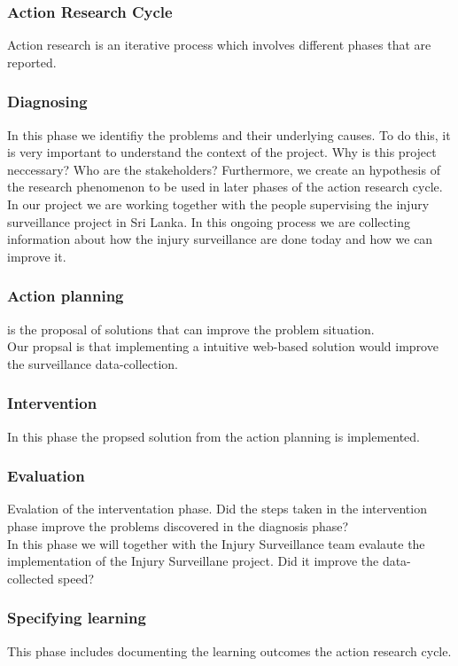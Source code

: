 \documentclass[UKenglish, 12pt]{article}
\begin{document}
\subsubsection*{Action Research Cycle}
Action research is an iterative process which involves different phases that are reported.

\subsubsection*{Diagnosing} In this phase we identifiy the problems and their underlying causes. To do this, it is very important to understand the context of the project. Why is this project neccessary? Who are the stakeholders? Furthermore,  we create an hypothesis of the research phenomenon to be used in later phases of the action research cycle. \\

In our project we are working together with the people supervising the injury surveillance project in Sri Lanka. In this ongoing process we are collecting information about how the injury surveillance are done today and how we can improve it. 

\subsubsection*{Action planning} is the proposal of solutions that can improve the problem situation. \\

Our propsal is that implementing a intuitive web-based solution would improve the surveillance data-collection.

\subsubsection*{Intervention} In this phase the propsed solution from the action planning is implemented.
\subsubsection*{Evaluation} Evalation of the interventation phase. Did the steps taken in the intervention phase improve the problems discovered in the diagnosis phase? \\
In this phase we will together with the Injury Surveillance team evalaute the implementation of the Injury Surveillane project. Did it improve the data-collected speed?
\subsubsection*{Specifying learning} This phase includes documenting the learning outcomes the action research cycle. 
\end{document}
